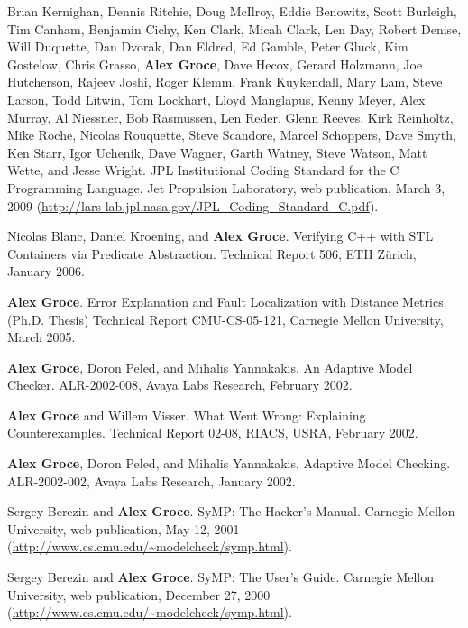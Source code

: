 \documentclass[ComputerScience]{vita}
\begin{document}
\begin{vita}
\begin{Technical Reports}
\item
Brian Kernighan, Dennis Ritchie, Doug McIlroy, Eddie Benowitz, Scott Burleigh, Tim Canham, Benjamin Cichy, Ken Clark, Micah Clark, Len Day, Robert Denise, Will Duquette, Dan Dvorak, Dan Eldred, Ed Gamble, Peter Gluck, Kim Gostelow, Chris Grasso, {\bf Alex Groce}, Dave Hecox, Gerard Holzmann, Joe Hutcherson, Rajeev Joshi, Roger Klemm, Frank Kuykendall, Mary Lam, Steve Larson, Todd Litwin, Tom Lockhart, Lloyd Manglapus, Kenny Meyer, Alex Murray, Al Niessner, Bob Rasmussen, Len Reder, Glenn Reeves, Kirk Reinholtz, Mike Roche, Nicolas Rouquette, Steve Scandore, Marcel Schoppers, Dave Smyth, Ken Starr, Igor Uchenik, Dave Wagner, Garth Watney, Steve Watson, Matt Wette, and Jesse Wright.
\newblock JPL Institutional Coding Standard for the C Programming Language.
\newblock Jet Propulsion Laboratory, web publication, March 3, 2009 (\url{http://lars-lab.jpl.nasa.gov/JPL\_Coding\_Standard\_C.pdf}).

\item
Nicolas Blanc, Daniel Kroening, and {\bf Alex Groce}.
\newblock Verifying C++ with STL Containers via Predicate Abstraction.
\newblock Technical Report 506, ETH Z\"urich, January 2006.

\item
{\bf Alex Groce}.
\newblock Error Explanation and Fault Localization with Distance Metrics.
\newblock (Ph.D. Thesis) Technical Report CMU-CS-05-121, Carnegie Mellon University, March 2005.

\item
{\bf Alex Groce}, Doron Peled, and Mihalis Yannakakis.
 An Adaptive Model Checker.
\newblock ALR-2002-008, Avaya Labs Research, February 2002.

\item
{\bf Alex Groce} and Willem Visser.
\newblock What Went Wrong: Explaining Counterexamples.
\newblock Technical Report 02-08, RIACS, USRA, February 2002.

\item
{\bf Alex Groce}, Doron Peled, and Mihalis Yannakakis.
\newblock Adaptive Model Checking.
\newblock ALR-2002-002, Avaya Labs Research, January 2002.

\item
Sergey Berezin and {\bf Alex Groce}.
\newblock SyMP: The Hacker's Manual.
\newblock Carnegie Mellon University, web publication, May 12, 2001 (\url{http://www.cs.cmu.edu/~modelcheck/symp.html}).

\item
Sergey Berezin and {\bf Alex Groce}.
\newblock SyMP: The User's Guide.
\newblock Carnegie Mellon University, web publication, December 27, 2000 (\url{http://www.cs.cmu.edu/~modelcheck/symp.html}).
\end{Technical Reports}


\end{vita}
\end{document}
